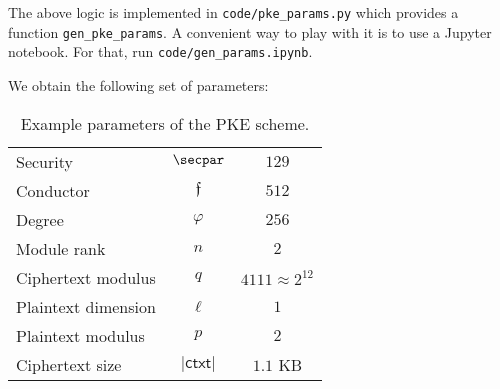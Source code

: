 \documentclass[a4paper,10pt]{article}
\newcommand{\ctxt}{\mathsf{ctxt}}
\newcommand{\conductor}{\mathfrak{f}}
\begin{document}
The above logic is implemented in \texttt{code/pke\_params.py} which provides a function \texttt{gen\_pke\_params}. 
A convenient way to play with it is to use a Jupyter notebook.
For that, run \texttt{code/gen\_params.ipynb}.

We obtain the following set of parameters: 

\begin{table}[h]
  \centering
  \begin{tabular}{lcc}
    Security & $\secpar$ & $129$  \\
    Conductor & $\conductor$ & $512$  \\
    Degree & $\varphi$ & $256$  \\
    Module rank & $n$ & $2$ \\ 
    Ciphertext modulus & $q$ & $4111 \approx 2^{12}$ \\ 
    Plaintext dimension & $\ell$ & $1$ \\
    Plaintext modulus & $p$ & $2$ \\ 
    Ciphertext size & $|\ctxt|$ & $1.1$ KB
  \end{tabular}
  \caption{Example parameters of the PKE scheme.}
\end{table}

\clearpage



\appendix
\clearpage
\end{document}
